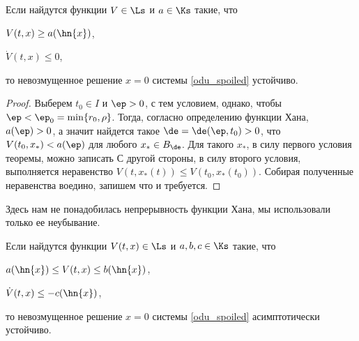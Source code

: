 \documentclass[a4paper,12pt]{article}
\begin{document}
\begin{theorem}[А.\,М.\,Ляпунов]
\label{th_lyap_2}
Если найдутся функции $V\in\Ls$ и $a\in\Ks$ такие, что
\begin{nums}{-2}
  \item $V(t,x)\ge a(\hn{x})$,
  \item $\dot{V}(t,x)\le0$,
\end{nums}
то невозмущенное решение $x=0$ системы \eqref{odu_spoiled} устойчиво.
\end{theorem}
\begin{proof}
Выберем $t_0\in I$ и $\ep>0$, с тем условием, однако, чтобы $\ep<\ep_0=\min\{r_0,\rho
\}$. Тогда, согласно определению функции Хана, $a(\ep)>0$, а значит найдется такое
$\de=\de(\ep,t_0)>0$, что $V(t_0,x_*)<a(\ep)$ для любого $x_*\in B_{\de}$. Для такого
$x_*$, в силу первого условия теоремы, можно записать  С другой стороны, в силу второго условия, выполняется неравенство
$V(t,x_*(t))\le V(t_0,x_*(t_0))$. Собирая полученные неравенства воедино, запишем
что и требуется.
\end{proof}
\begin{note}
Здесь нам не понадобилась непрерывность функции Хана, мы использовали только ее неубывание.
\end{note}
\begin{theorem}
Если найдутся функции $V(t,x)\in\Ls$ и $a,b,c\in\Ks$ такие, что
\begin{nums}{-2}
  \item $a(\hn{x})\le V(t,x)\le b(\hn{x})$,
  \item $\dot{V}(t,x)\le -c(\hn{x})$,
\end{nums}
то невозмущенное решение $x=0$ системы \eqref{odu_spoiled} асимптотически устойчиво.
\end{theorem}
\end{document}
